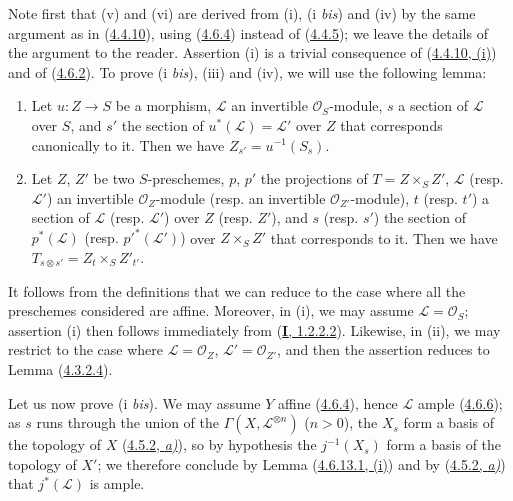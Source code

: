 Note first that (v) and (vi) are derived from (i), (i \emph{bis}) and (iv) by the
same argument as in (\hyperref[II.4.4.10]{4.4.10}), using
(\hyperref[II.4.6.4]{4.6.4}) instead of
(\hyperref[II.4.4.5]{4.4.5}); we leave the details of the argument to the
reader. Assertion (i) is a trivial consequence of
(\hyperref[II.4.4.10]{4.4.10, (i)}) and of
(\hyperref[II.4.6.2]{4.6.2}). To prove (i \emph{bis}), (iii) and (iv), we
will use the following lemma:

\begin{lemma}[4.6.13.1]
\label{II.4.6.13.1}
\begin{enumerate}
  \item[\rm{(i)}] Let $u:Z\to S$ be a morphism, $\mathcal{L}$ an invertible
  $\mathcal{O}_S$-module, $s$ a section of $\mathcal{L}$
  over $S$, and $s'$ the section of $u^*(\mathcal{L})=\mathcal{L}'$
  over $Z$ that corresponds canonically to it. Then we have
  $Z_{s'}=u^{-1}(S_s)$.
  \item[\rm{(ii)}] Let $Z$, $Z'$ be two $S$-preschemes, $p$, $p'$ the
  projections of $T=Z\times_S Z'$, $\mathcal{L}$ \textup{(resp.
  $\mathcal{L}'$)} an invertible $\mathcal{O}_Z$-module \textup{(resp.} an invertible
  $\mathcal{O}_{Z'}$-module\textup{)}, $t$ \textup{(resp. $t'$)} a section of
  $\mathcal{L}$ \textup{(resp. $\mathcal{L}'$)} over $Z$ \textup{(resp. $Z'$)}, and $s$
  \textup{(resp. $s'$)} the section of $p^*(\mathcal{L})$ \textup{(resp.
  $p'^*(\mathcal{L}')$)} over $Z\times_S Z'$ that corresponds to it.
  Then we have $T_{s\otimes s'}=Z_t\times_S Z'_{t'}$.
\end{enumerate}
\end{lemma}

It follows from the definitions that we can reduce to the case where all the
preschemes considered are affine. Moreover, in (i), we may assume
$\mathcal{L}=\mathcal{O}_S$; assertion (i) then follows immediately from
(\hyperref[I.1.2.2.2]{\textbf{I}, 1.2.2.2}). Likewise, in (ii), we may
restrict to the case where $\mathcal{L}=\mathcal{O}_Z$,
$\mathcal{L}'=\mathcal{O}_{Z'}$, and then the assertion reduces to
Lemma (\hyperref[II.4.3.2.4]{4.3.2.4}).

Let us now prove (i \emph{bis}). We may assume $Y$ affine
(\hyperref[II.4.6.4]{4.6.4}), hence $\mathcal{L}$ ample
(\hyperref[II.4.6.6]{4.6.6}); as $s$ runs through the union
of the $\Gamma(X,\mathcal{L}^{\otimes n})$ ($n>0$), the $X_s$ form a
basis of the topology of $X$ (\hyperref[II.4.5.2]{4.5.2, \emph{a)}}), so by
hypothesis the $j^{-1}(X_s)$ form a basis of the topology of $X'$; we
therefore conclude by Lemma
(\hyperref[II.4.6.13.1]{4.6.13.1, (i)}) and by
(\hyperref[II.4.5.2]{4.5.2, \emph{a)}}) that $j^*(\mathcal{L})$ is ample.

